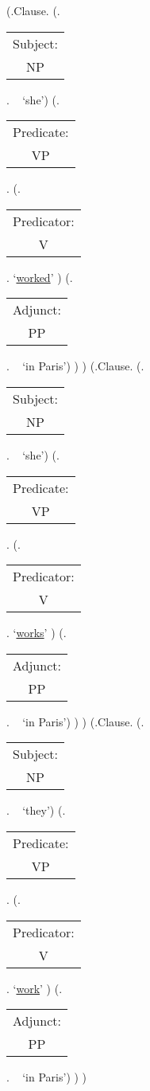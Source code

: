 \documentclass[12pt,letterpaper]{article}
\begin{document}
\begin{figure}
	\begin{center}
		\begin{parsetree}
			
			(.Clause.
			(.\begin{tabular}{c}Subject:\\NP\end{tabular}. ~ `she')
			(.\begin{tabular}{c}Predicate:\\VP\end{tabular}.
			(.\begin{tabular}{c}Predicator:\\V\end{tabular}. `\underline{worked}' )
			(.\begin{tabular}{c}Adjunct:\\PP\end{tabular}. ~ `in Paris')
			)
			)
			(.Clause.
			(.\begin{tabular}{c}Subject:\\NP\end{tabular}. ~ `she')
			(.\begin{tabular}{c}Predicate:\\VP\end{tabular}.
			(.\begin{tabular}{c}Predicator:\\V\end{tabular}. `\underline{works}' )
			(.\begin{tabular}{c}Adjunct:\\PP\end{tabular}. ~ `in Paris')
			)
			)
			(.Clause.
			(.\begin{tabular}{c}Subject:\\NP\end{tabular}. ~ `they')
			(.\begin{tabular}{c}Predicate:\\VP\end{tabular}.
			(.\begin{tabular}{c}Predicator:\\V\end{tabular}. `\underline{work}' )
			(.\begin{tabular}{c}Adjunct:\\PP\end{tabular}. ~ `in Paris')
			)
			)
			

\end{parsetree}
\end{center}
\end{figure}
\end{document}
